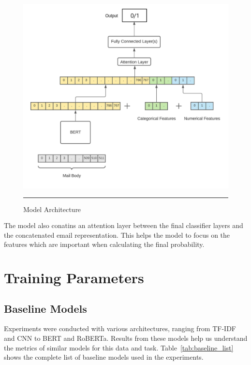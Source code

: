 \begin{figure}[htbp]
  \centering
    \includegraphics[scale=0.3]{Figures/model_architecture_lucid.jpg}
    \rule{10em}{0.5pt}
  \caption[Model Architecture]{Model Architecture}
  \label{fig:model_architecture}
\end{figure}

The model also conatins an attention layer between the final classifier layers and the concatenated email representation. This helps the model to focus on the features which are important when calculating the final probability.   

\section{Training Parameters}

\subsection{Baseline Models}

Experiments were conducted with various architectures, ranging from TF-IDF and CNN to BERT and RoBERTa.  Results from these models help us understand the metrics of similar models for this data and task. Table~\ref{tab:baseline_list} shows the complete list of baseline models used in the experiments.\\



